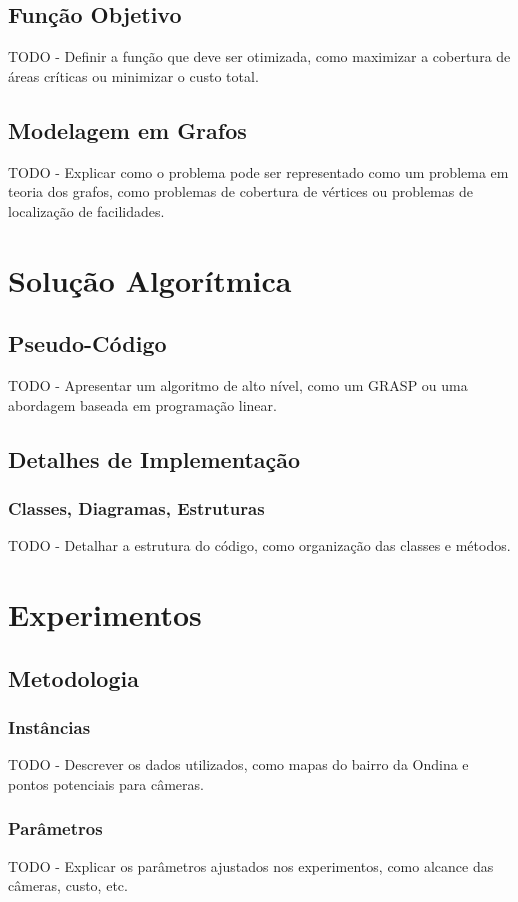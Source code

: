 \documentclass[12pt, a4paper]{report}
\begin{document}
\section{Função Objetivo}
TODO - Definir a função que deve ser otimizada, como maximizar a cobertura de áreas críticas ou minimizar o custo total.

\section{Modelagem em Grafos}
TODO - Explicar como o problema pode ser representado como um problema em teoria dos grafos, como problemas de cobertura de vértices ou problemas de localização de facilidades.

\chapter{Solução Algorítmica}

\section{Pseudo-Código}
TODO - Apresentar um algoritmo de alto nível, como um GRASP ou uma abordagem baseada em programação linear.

\section{Detalhes de Implementação}
\subsection{Classes, Diagramas, Estruturas}
TODO - Detalhar a estrutura do código, como organização das classes e métodos.

\chapter{Experimentos}

\section{Metodologia}
\subsection{Instâncias}
TODO - Descrever os dados utilizados, como mapas do bairro da Ondina e pontos potenciais para câmeras.

\subsection{Parâmetros}
TODO - Explicar os parâmetros ajustados nos experimentos, como alcance das câmeras, custo, etc.
\end{document}
